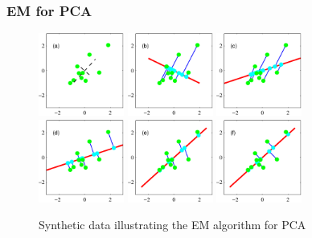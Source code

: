 \documentclass{beamer}
\begin{document}
\begin{frame}
    \frametitle{EM for PCA}
    \begin{figure}
        \caption{Synthetic data illustrating the EM algorithm for PCA}
        \includegraphics[width=0.25\textwidth]{Figure_10_a.pdf}
        \includegraphics[width=0.25\textwidth]{Figure_10_b.pdf}
        \includegraphics[width=0.25\textwidth]{Figure_10_c.pdf}
        \includegraphics[width=0.25\textwidth]{Figure_10_d.pdf}
        \includegraphics[width=0.25\textwidth]{Figure_10_e.pdf}
        \includegraphics[width=0.25\textwidth]{Figure_10_f.pdf}
    \end{figure}
\end{frame}
\end{document}

